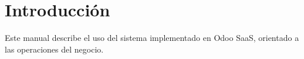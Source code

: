 \section{Introducción}
Este manual describe el uso del sistema implementado en Odoo SaaS, orientado a las operaciones del negocio.

